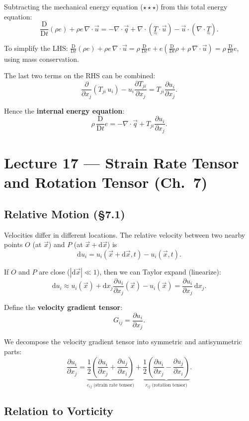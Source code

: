 \documentclass[11pt,a4paper]{article}
\newcommand{\D}{\mathrm{D}}
\newcommand{\Dt}{\frac{\D}{\D t}}
\newcommand{\pdx}[2]{\frac{\partial #1}{\partial #2}}
\newcommand{\xv}{\vec{x}}
\newcommand{\uv}{\vec{u}}
\newcommand{\tens}[1]{\underset{\approx}{#1}}
\begin{document}
Subtracting the mechanical energy equation ($\star\star\star$) from this total energy equation:
\[
    \Dt(\rho e) + \rho e\,\nabla\cdot\uv = -\nabla\cdot\vec{q} + \nabla\cdot(\tens{T}\cdot\uv) - \uv\cdot(\nabla\cdot\tens{T}).
\]

To simplify the LHS: $\Dt(\rho e) + \rho e\,\nabla\cdot\uv = \rho\,\Dt e + e(\Dt\rho + \rho\,\nabla\cdot\uv) = \rho\,\Dt e$, using mass conservation.

The last two terms on the RHS can be combined:
\[
    \pdx{}{x_j}(T_{ji}\,u_i) - u_i\pdx{T_{ji}}{x_j} = T_{ji}\pdx{u_i}{x_j}.
\]

Hence the \textbf{internal energy equation}:
\[
    \boxed{\rho\,\Dt e = -\nabla\cdot\vec{q} + T_{ji}\pdx{u_i}{x_j}.}
\]

\section{Lecture 17 --- Strain Rate Tensor and Rotation Tensor (Ch.\ 7)}

\subsection{Relative Motion (\S7.1)}

Velocities differ in different locations. The relative velocity between two nearby points $O$ (at $\xv$) and $P$ (at $\xv + \mathrm{d}\xv$) is
\[
    \mathrm{d}u_i = u_i(\xv + \mathrm{d}\xv, t) - u_i(\xv, t).
\]

If $O$ and $P$ are close ($|\mathrm{d}\xv| \ll 1$), then we can Taylor expand (linearize):
\[
    \mathrm{d}u_i \approx u_i(\xv) + \mathrm{d}x_j\pdx{u_i}{x_j}(\xv) - u_i(\xv) = \pdx{u_i}{x_j}\,\mathrm{d}x_j.
\]

Define the \textbf{velocity gradient tensor}:
\[
    \boxed{G_{ij} = \pdx{u_i}{x_j}.}
\]

We decompose the velocity gradient tensor into symmetric and antisymmetric parts:
\[
    \pdx{u_i}{x_j} = \underbrace{\frac{1}{2}\left(\pdx{u_i}{x_j} + \pdx{u_j}{x_i}\right)}_{e_{ij}\;\text{(strain rate tensor)}} + \underbrace{\frac{1}{2}\left(\pdx{u_i}{x_j} - \pdx{u_j}{x_i}\right)}_{r_{ij}\;\text{(rotation tensor)}}.
\]

\subsection{Relation to Vorticity}
\end{document}
